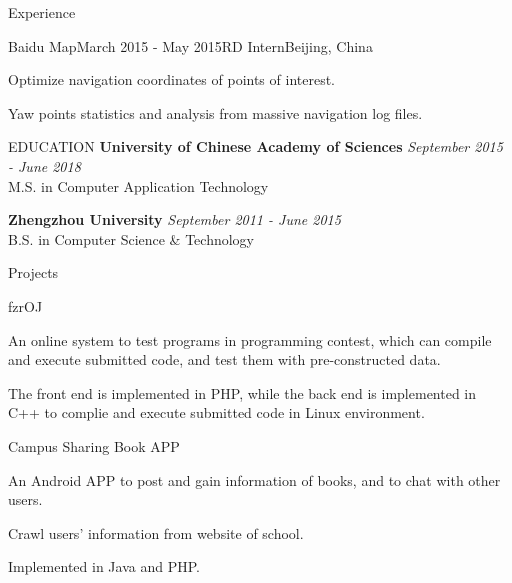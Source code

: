 \documentclass{resume} %
\begin{document}
\begin{rSection}{Experience}
\begin{rSubsection}{Baidu Map}{March 2015 - May 2015}{RD Intern}{Beijing, China}
\item Optimize navigation coordinates of points of interest.
\item Yaw points statistics and analysis from massive navigation log files.
\end{rSubsection}
\end{rSection}





\begin{rSection}{EDUCATION}
{\bf University of Chinese Academy of Sciences} \hfill {\em September 2015 - June 2018} \\
M.S. in Computer Application Technology
\vspace{0.3em}

{\bf Zhengzhou University} \hfill {\em September 2011 - June 2015} \\
B.S. in Computer Science \& Technology
\vspace{0.5em}
\end{rSection}




\begin{rSection}{Projects}
\begin{rSubsection}{fzrOJ}{}{}{}
\item An online system to test programs in programming contest, which can compile and execute submitted code, and test them with pre-constructed data.
\item The front end is implemented in PHP, while the back end is implemented in C++ to complie and execute submitted code in Linux environment.
\end{rSubsection}

\begin{rSubsection}{Campus Sharing Book APP}{}{}{}
\item An Android APP to post and gain information of books, and to chat with other users.
\item Crawl users' information from website of school.
\item Implemented in Java and PHP.
\end{rSubsection}
\end{rSection}
\end{document}
